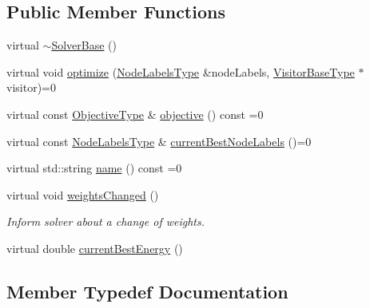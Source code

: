 \subsection*{Public Member Functions}
\begin{DoxyCompactItemize}
\item 
virtual \hyperlink{classnifty_1_1graph_1_1optimization_1_1common_1_1SolverBase_a9442c4193dab19dbcc37c8f927b6de94}{$\sim$\+Solver\+Base} ()
\item 
virtual void \hyperlink{classnifty_1_1graph_1_1optimization_1_1common_1_1SolverBase_a1c08eb1ff2b3cca5366c3aab161ba040}{optimize} (\hyperlink{classnifty_1_1graph_1_1optimization_1_1common_1_1SolverBase_a6e4e465f3b6e039882669fcfb9714818}{Node\+Labels\+Type} \&node\+Labels, \hyperlink{classnifty_1_1graph_1_1optimization_1_1common_1_1SolverBase_a5a14d64c70a9cc0eebc7d71d2b089f9b}{Visitor\+Base\+Type} $\ast$visitor)=0
\item 
virtual const \hyperlink{classnifty_1_1graph_1_1optimization_1_1common_1_1SolverBase_a28e77903302d3c14fa9fddb5d0a6214d}{Objective\+Type} \& \hyperlink{classnifty_1_1graph_1_1optimization_1_1common_1_1SolverBase_ae7d36a7485b12a25979f75771f52e397}{objective} () const  =0
\item 
virtual const \hyperlink{classnifty_1_1graph_1_1optimization_1_1common_1_1SolverBase_a6e4e465f3b6e039882669fcfb9714818}{Node\+Labels\+Type} \& \hyperlink{classnifty_1_1graph_1_1optimization_1_1common_1_1SolverBase_a3634ba645adbb7a668500e807608bcca}{current\+Best\+Node\+Labels} ()=0
\item 
virtual std\+::string \hyperlink{classnifty_1_1graph_1_1optimization_1_1common_1_1SolverBase_abc9685a3d63748ac470afccb2813be7e}{name} () const  =0
\item 
virtual void \hyperlink{classnifty_1_1graph_1_1optimization_1_1common_1_1SolverBase_a8ab38d61068370e24cca475ef1b5d8b1}{weights\+Changed} ()
\begin{DoxyCompactList}\small\item\em Inform solver about a change of weights. \end{DoxyCompactList}\item 
virtual double \hyperlink{classnifty_1_1graph_1_1optimization_1_1common_1_1SolverBase_ae6f6d9779398689c84984a7b6083604a}{current\+Best\+Energy} ()
\end{DoxyCompactItemize}


\subsection{Member Typedef Documentation}
\hypertarget{classnifty_1_1graph_1_1optimization_1_1common_1_1SolverBase_a5b93d8c567c27949a944e908f59f8933}{}
